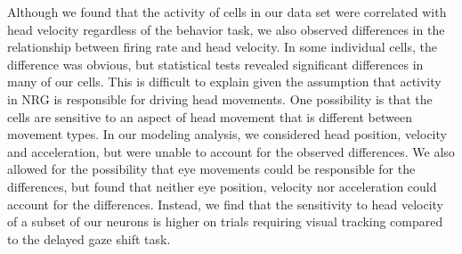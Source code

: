 \documentclass[]{article}
\begin{document}
Although we found that the activity of cells in our data set were
correlated with head velocity regardless of the behavior task, we also
observed differences in the relationship between firing rate and head
velocity. In some individual cells, the difference was obvious, but
statistical tests revealed significant differences in many of our cells.
This is difficult to explain given the assumption that activity in NRG
is responsible for driving head movements. One possibility is that the
cells are sensitive to an aspect of head movement that is different
between movement types. In our modeling analysis, we considered head
position, velocity and acceleration, but were unable to account for the
observed differences. We also allowed for the possibility that eye
movements could be responsible for the differences, but found that
neither eye position, velocity nor acceleration could account for the
differences. Instead, we find that the sensitivity to head velocity of a
subset of our neurons is higher on trials requiring visual tracking
compared to the delayed gaze shift task.
\end{document}
